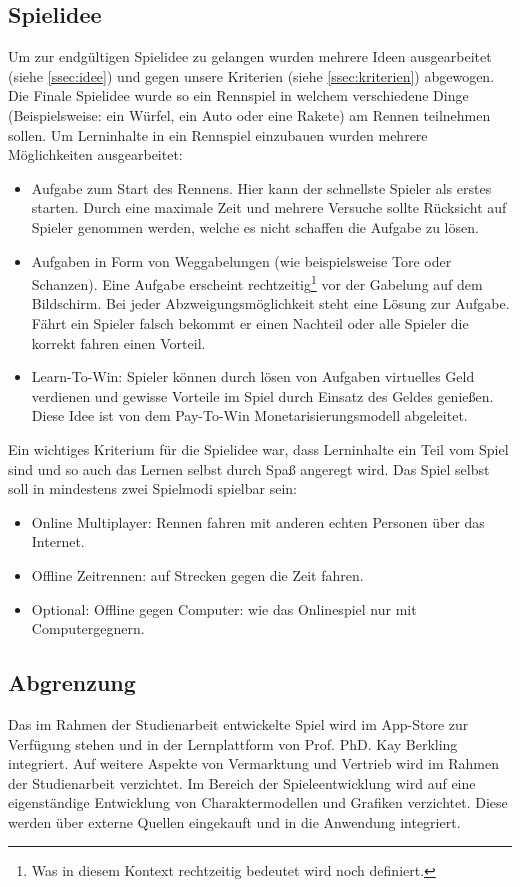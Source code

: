 \subsection{Spielidee}
	Um zur endgültigen Spielidee zu gelangen wurden mehrere Ideen ausgearbeitet (siehe \ref{ssec:idee}) und gegen unsere Kriterien (siehe \ref{ssec:kriterien}) abgewogen.
	Die Finale Spielidee wurde so ein Rennspiel in welchem verschiedene Dinge (Beispielsweise: ein Würfel, ein Auto oder eine Rakete) am Rennen teilnehmen sollen. Um Lerninhalte in ein Rennspiel einzubauen wurden mehrere Möglichkeiten ausgearbeitet:
	\begin{itemize}
		\item{ Aufgabe zum Start des Rennens. Hier kann der schnellste Spieler als erstes starten. Durch eine maximale Zeit und mehrere Versuche sollte Rücksicht auf Spieler genommen werden, welche es nicht schaffen die Aufgabe zu lösen. }
		\item{ Aufgaben in Form von Weggabelungen (wie beispielsweise Tore oder Schanzen). Eine Aufgabe erscheint rechtzeitig\footnote{Was in diesem Kontext rechtzeitig bedeutet wird noch definiert.} vor der Gabelung auf dem Bildschirm. Bei jeder Abzweigungsmöglichkeit steht eine Lösung zur Aufgabe. Fährt ein Spieler falsch  bekommt er einen Nachteil oder alle Spieler die korrekt fahren einen Vorteil. }
		\item{ Learn-To-Win: Spieler können durch lösen von Aufgaben virtuelles Geld verdienen und gewisse Vorteile im Spiel durch Einsatz des Geldes genießen. Diese Idee ist von dem Pay-To-Win Monetarisierungsmodell abgeleitet. }
	\end{itemize}
	Ein wichtiges Kriterium für die Spielidee war, dass Lerninhalte ein Teil vom Spiel sind und so auch das Lernen selbst durch Spaß angeregt wird.
	Das Spiel selbst soll in mindestens zwei Spielmodi spielbar sein:
	\begin{itemize}
		\item{ Online Multiplayer: Rennen fahren mit anderen echten Personen über das Internet. }
		\item{ Offline Zeitrennen: auf Strecken gegen die Zeit fahren. }
		\item{ Optional: Offline gegen Computer: wie das Onlinespiel nur mit Computergegnern. }
	\end{itemize}

\subsection{Abgrenzung}
	Das im Rahmen der Studienarbeit entwickelte Spiel wird im App-Store zur Verfügung stehen und in der Lernplattform von Prof. PhD. Kay Berkling integriert. Auf weitere Aspekte von Vermarktung und Vertrieb wird im Rahmen der Studienarbeit verzichtet.
	Im Bereich der Spieleentwicklung wird auf eine eigenständige Entwicklung von Charaktermodellen und Grafiken verzichtet. Diese werden über externe Quellen eingekauft und in die Anwendung integriert.

